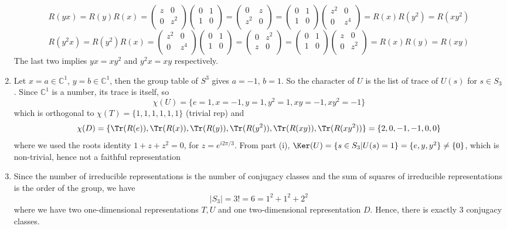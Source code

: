 \documentclass[a4paper]{article}
\begin{document}
\begin{ans}
\begin{enumerate}[label=(\roman*)]
$$R(yx)=R(y)R(x)=\begin{pmatrix}z&0\\0&z^2\\\end{pmatrix}\begin{pmatrix}0&1\\1&0\\\end{pmatrix}=\begin{pmatrix}0&z\\z^2&0\\\end{pmatrix}=\begin{pmatrix}0&1\\1&0\\\end{pmatrix}\begin{pmatrix}z^2&0\\0&z^4\\\end{pmatrix}=R(x)R(y^2)=R(xy^2)$$
$$R(y^2x)=R(y^2)R(x)=\begin{pmatrix}z^2&0\\0&z^4\\\end{pmatrix}\begin{pmatrix}0&1\\1&0\\\end{pmatrix}=\begin{pmatrix}0&z^2\\z&0\\\end{pmatrix}=\begin{pmatrix}0&1\\1&0\\\end{pmatrix}\begin{pmatrix}z&0\\0&z^2\\\end{pmatrix}=R(x)R(y)=R(xy)$$
The last two implies $yx=xy^2$ and $y^2x=xy$ respectively.
\item Let $x=a\in\mathbb{C}^1$, $y=b\in\mathbb{C}^1$, then the group table of $S^3$ gives $a=-1$, $b=1$. So the character of $U$ is the list of trace of $U(s)$ for $s\in S_3$. Since $\mathbb{C}^1$ is a number, its trace is itself, so
$$\chi(U)=\{e=1,x=-1,y=1,y^2=1,xy=-1,xy^2=-1\}$$
which is orthogonal to $\chi(T)=\{1,1,1,1,1,1\}$ (trivial rep) and 
$$\chi(D)=\{\Tr(R(e)),\Tr(R(x)),\Tr(R(y)),\Tr(R(y^2)),\Tr(R(xy)),\Tr(R(xy^2))\}=\{2,0,-1,-1,0,0\}$$
where we used the roots identity $1+z+z^2=0$, for $z=e^{i2\pi/3}$. From part (i), $\Ker(U)=\{s\in S_3|U(s)=1\}=\{e,y,y^2\}\neq\{0\}$, which is non-trivial, hence not a  faithful representation
\item Since the number of irreducible representations is the number of conjugacy classes and the sum of squares of irreducible representations is the order of the group, we have
$$|S_3|=3!=6=1^2+1^2+2^2$$
where we have two one-dimensional representations $T,U$ and one two-dimensional representation $D$. Hence, there is exactly 3 conjugacy classes.



\end{enumerate}
\end{ans}
\end{document}
